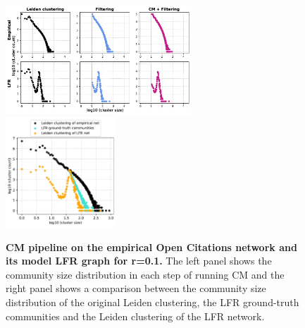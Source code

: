 \documentclass[a4paper]{article}   	%
\begin{document}
\begin{figure}[h!]
\centering
\includegraphics[width=0.62\textwidth]{figs/oc_cm_steps_lfr1.pdf}
\includegraphics[width=0.37\textwidth]{figs/oc_1_cm_size.pdf}
\caption[CM pipeline on the empirical Open Citations network and its model LFR graph for r=0.1]{\textbf{CM pipeline on the empirical Open Citations network and its model LFR graph for r=0.1.} The left panel shows the community size distribution in each step of running CM and the right panel shows a comparison between the community size distribution of the original Leiden clustering, the LFR ground-truth communities and the Leiden clustering of the LFR network.}
\label{fig:oc-cm-lfr-1}
\end{figure}
\end{document}
